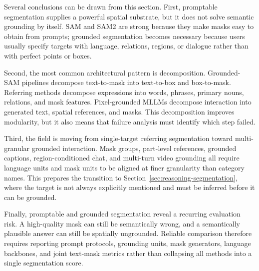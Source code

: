 Several conclusions can be drawn from this section. First, promptable segmentation supplies a powerful spatial substrate, but it does not solve semantic grounding by itself. SAM and SAM2 are strong because they make masks easy to obtain from prompts; grounded segmentation becomes necessary because users usually specify targets with language, relations, regions, or dialogue rather than with perfect points or boxes.

Second, the most common architectural pattern is decomposition. Grounded-SAM pipelines decompose text-to-mask into text-to-box and box-to-mask. Referring methods decompose expressions into words, phrases, primary nouns, relations, and mask features. Pixel-grounded MLLMs decompose interaction into generated text, spatial references, and masks. This decomposition improves modularity, but it also means that failure analysis must identify which step failed.

Third, the field is moving from single-target referring segmentation toward multi-granular grounded interaction. Mask groups, part-level references, grounded captions, region-conditioned chat, and multi-turn video grounding all require language units and mask units to be aligned at finer granularity than category names. This prepares the transition to Section~\ref{sec:reasoning-segmentation}, where the target is not always explicitly mentioned and must be inferred before it can be grounded.

Finally, promptable and grounded segmentation reveal a recurring evaluation risk. A high-quality mask can still be semantically wrong, and a semantically plausible answer can still be spatially ungrounded. Reliable comparison therefore requires reporting prompt protocols, grounding units, mask generators, language backbones, and joint text-mask metrics rather than collapsing all methods into a single segmentation score.
